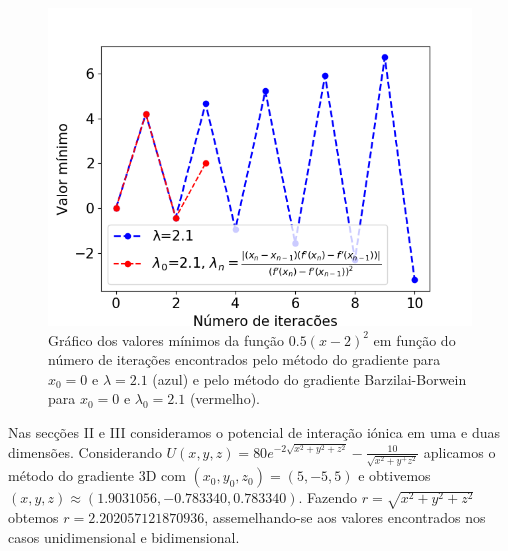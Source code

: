 \documentclass[aps,pre,twocolumn,showpacs,amsmath,amssymb]{revtex4-1}
\begin{document}
\begin{figure}[h]\vspace{0ex}
   \begin{center}
    \includegraphics[width=\columnwidth]{otimizacaometodogradiente.png}
\caption{Gráfico dos valores mínimos da função $0.5(x-2)^2$ em função do número de iterações encontrados pelo método do gradiente para $x_0 = 0$ e $\lambda = 2.1$ (azul) e pelo método do gradiente Barzilai-Borwein para $x_0 = 0$ e $\lambda_0 = 2.1$ (vermelho).}
  \label{otimizacaometodogradiente}
   \end{center}
\end{figure}

Nas secções II e III consideramos o potencial de interação iónica em uma e duas dimensões. Considerando $U(x,y,z)=80e^{-2\sqrt{x^2+y^2+z^2}}-\frac{10}{\sqrt{x^2+y^+z^2}}$ aplicamos o método do gradiente 3D com $(x_0,y_0,z_0)=(5,-5,5)$ e obtivemos $(x,y,z)\approx(1.9031056,-0.783340,0.783340)$. Fazendo $r=\sqrt{x^2+y^2+z^2}$ obtemos $r=2.202057121870936$, assemelhando-se aos valores encontrados nos casos unidimensional e bidimensional.
\end{document}
